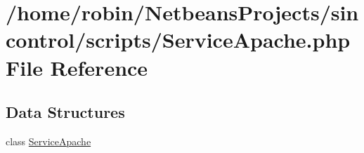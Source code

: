 \hypertarget{scripts_2_service_apache_8php}{}\section{/home/robin/\+Netbeans\+Projects/sincontrol/scripts/\+Service\+Apache.php File Reference}
\label{scripts_2_service_apache_8php}
\subsection*{Data Structures}
\begin{DoxyCompactItemize}
\item 
class \hyperlink{class_service_apache}{Service\+Apache}
\end{DoxyCompactItemize}
